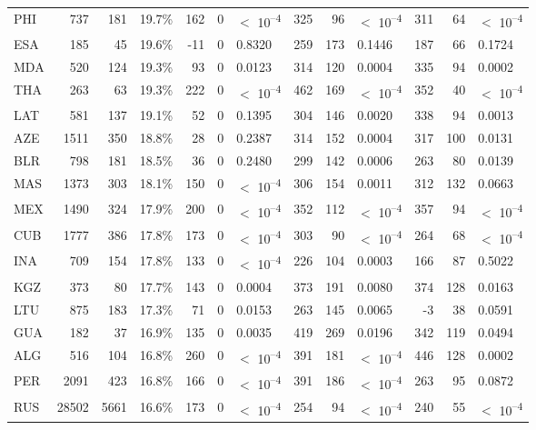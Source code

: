 \begin{tabular}[t]{lrrlrrlrrlrrl}
PHI & 737 & 181 & 19.7\% & 162 & 0 & $<$ 10\textsuperscript{--4} & 325 & 96 & $<$ 10\textsuperscript{--4} & 311 & 64 & $<$ 10\textsuperscript{--4}\\
ESA & 185 & 45 & 19.6\% & -11 & 0 & 0.8320 & 259 & 173 & 0.1446 & 187 & 66 & 0.1724\\
MDA & 520 & 124 & 19.3\% & 93 & 0 & 0.0123 & 314 & 120 & 0.0004 & 335 & 94 & 0.0002\\
THA & 263 & 63 & 19.3\% & 222 & 0 & $<$ 10\textsuperscript{--4} & 462 & 169 & $<$ 10\textsuperscript{--4} & 352 & 40 & $<$ 10\textsuperscript{--4}\\
LAT & 581 & 137 & 19.1\% & 52 & 0 & 0.1395 & 304 & 146 & 0.0020 & 338 & 94 & 0.0013\\
AZE & 1511 & 350 & 18.8\% & 28 & 0 & 0.2387 & 314 & 152 & 0.0004 & 317 & 100 & 0.0131\\
BLR & 798 & 181 & 18.5\% & 36 & 0 & 0.2480 & 299 & 142 & 0.0006 & 263 & 80 & 0.0139\\
MAS & 1373 & 303 & 18.1\% & 150 & 0 & $<$ 10\textsuperscript{--4} & 306 & 154 & 0.0011 & 312 & 132 & 0.0663\\
MEX & 1490 & 324 & 17.9\% & 200 & 0 & $<$ 10\textsuperscript{--4} & 352 & 112 & $<$ 10\textsuperscript{--4} & 357 & 94 & $<$ 10\textsuperscript{--4}\\
CUB & 1777 & 386 & 17.8\% & 173 & 0 & $<$ 10\textsuperscript{--4} & 303 & 90 & $<$ 10\textsuperscript{--4} & 264 & 68 & $<$ 10\textsuperscript{--4}\\
INA & 709 & 154 & 17.8\% & 133 & 0 & $<$ 10\textsuperscript{--4} & 226 & 104 & 0.0003 & 166 & 87 & 0.5022\\
KGZ & 373 & 80 & 17.7\% & 143 & 0 & 0.0004 & 373 & 191 & 0.0080 & 374 & 128 & 0.0163\\
LTU & 875 & 183 & 17.3\% & 71 & 0 & 0.0153 & 263 & 145 & 0.0065 & -3 & 38 & 0.0591\\
GUA & 182 & 37 & 16.9\% & 135 & 0 & 0.0035 & 419 & 269 & 0.0196 & 342 & 119 & 0.0494\\
ALG & 516 & 104 & 16.8\% & 260 & 0 & $<$ 10\textsuperscript{--4} & 391 & 181 & $<$ 10\textsuperscript{--4} & 446 & 128 & 0.0002\\
PER & 2091 & 423 & 16.8\% & 166 & 0 & $<$ 10\textsuperscript{--4} & 391 & 186 & $<$ 10\textsuperscript{--4} & 263 & 95 & 0.0872\\
RUS & 28502 & 5661 & 16.6\% & 173 & 0 & $<$ 10\textsuperscript{--4} & 254 & 94 & $<$ 10\textsuperscript{--4} & 240 & 55 & $<$ 10\textsuperscript{--4}\\

\end{tabular}
